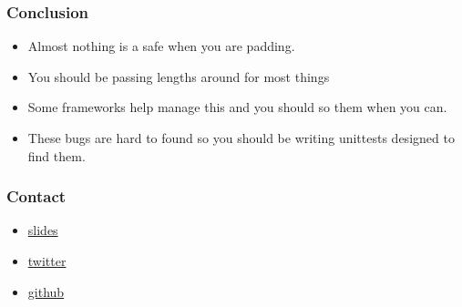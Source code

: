 \documentclass{beamer}
\begin{document}
\begin{frame}
    \frametitle{Conclusion}
    \begin{itemize}
        \item Almost nothing is a safe when you are padding.
        \item You should be passing lengths around for most things
        \item Some frameworks help manage this and you should so them when you can.
        \item These bugs are hard to found so you should be writing unittests designed to find them.
    \end{itemize}
\end{frame}

\begin{frame}
    \frametitle{Contact}
    \begin{itemize}
        \item \href{}{slides}
        \item \href{}{twitter}
        \item \href{}{github}
    \end{itemize}
\end{frame}
\end{document}
